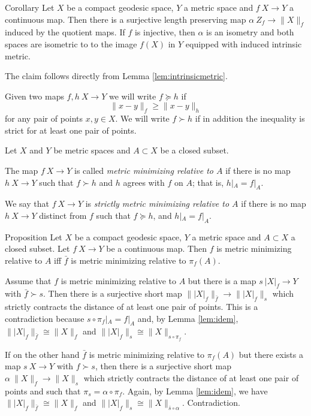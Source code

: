 \documentclass[a4paper,10pt]{amsart}
\begin{document}
\begin{thm}{Corollary}\label{cor:reltolengthmetric}
Let $X$ be a compact geodesic space, $Y$ a metric space and $f\:X\to Y$ a continuous map. Then there is a surjective length preserving map
$\alpha\:Z_f\to\|X\|_f$ induced by the quotient maps. If $f$ is injective, then $\alpha$ is an isometry and both spaces are isometric to
to the image $f(X)$ in $Y$ equipped with induced intrinsic metric.
\end{thm}
The claim follows directly from Lemma \ref{lem:intrinsicmetric}.
\qeds

Given two maps $f,h\:X\to Y$ we will write $f\succcurlyeq h$ if 
\[\|x-y\|_f\ge \|x-y\|_h\]
for any pair of points $x,y\in X$.
We will write $f\succ h$ 
if in addition the inequality is strict for at least one pair of points.



Let $X$ and $Y$ be metric spaces and $A\subset X$ be a closed subset.

The map $f\:X\to Y$ is called \emph{metric minimizing relative to $A$}
if there is no map $h\:X\to Y$ such that $f\succ h$
and $h$ agrees with $f$ on $A$;
that is, $h|_A=f|_A$.

We say that $f\:X\to Y$ is \emph{strictly metric minimizing relative to $A$}
if there is no map $h\:X\to Y$ distinct from $f$
such that $f\succcurlyeq h$, 
and $h|_A=f|_A$.

\begin{thm}{Proposition}\label{prop:memicrit}
Let $X$ be a compact geodesic space, $Y$ a metric space 
and $A\subset X$ a closed subset.
Let $f\:X\to Y$ be a continuous map. Then $f$ is metric minimizing relative to $A$
iff $\bar f$ is metric minimizing relative to $\pi_f(A)$.
\end{thm}

Assume that $f$ is metric minimizing relative to $A$ but there is a map $s\:|X|_f\to Y$ with $\bar f\succ s$. 
Then there is a surjective short map $\||X|_f\|_{\bar f}\to\||X|_f\|_s$ which strictly
contracts the distance of at least one pair of points. This is a contradiction because $s\circ\pi_f|_A=f|_A$ and, by Lemma \ref{lem:idem}, 
$\||X|_f\|_{\bar f}\cong\|X\|_f$ and $\||X|_f\|_s\cong\|X\|_{s\circ\pi_f}$. 

If on the other hand $\bar f$ is metric minimizing relative to $\pi_f(A)$ but there exists a map $s\:X\to Y$ with $f\succ s$,
then there is a surjective short map $\alpha\:\|X\|_f\to\|X\|_s$ which strictly
contracts the distance of at least one pair of points and such that $\pi_s=\alpha\circ\pi_f$. Again, by Lemma \ref{lem:idem}, we have 
$\||X|_f\|_{\bar f}\cong\|X\|_f$ and $\||X|_f\|_s\cong\|X\|_{\bar s\circ\alpha}$. Contradiction. 
\qeds
\end{document}
